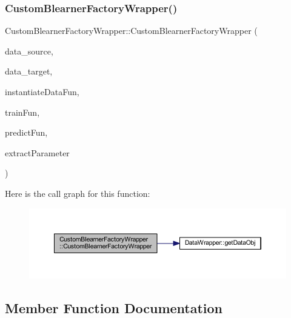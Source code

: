 \subsubsection{\texorpdfstring{Custom\+Blearner\+Factory\+Wrapper()}{CustomBlearnerFactoryWrapper()}}
{\footnotesize\ttfamily Custom\+Blearner\+Factory\+Wrapper\+::\+Custom\+Blearner\+Factory\+Wrapper (\begin{DoxyParamCaption}\item[{\mbox{\hyperlink{class_data_wrapper}{Data\+Wrapper}} \&}]{data\+\_\+source,  }\item[{\mbox{\hyperlink{class_data_wrapper}{Data\+Wrapper}} \&}]{data\+\_\+target,  }\item[{Rcpp\+::\+Function}]{instantiate\+Data\+Fun,  }\item[{Rcpp\+::\+Function}]{train\+Fun,  }\item[{Rcpp\+::\+Function}]{predict\+Fun,  }\item[{Rcpp\+::\+Function}]{extract\+Parameter }\end{DoxyParamCaption})\hspace{0.3cm}{\ttfamily [inline]}}

Here is the call graph for this function\+:\nopagebreak
\begin{figure}[H]
\begin{center}
\leavevmode
\includegraphics[width=350pt]{class_custom_blearner_factory_wrapper_af2a4252cc47bb70c23c71ed3f201e29f_cgraph}
\end{center}
\end{figure}


\subsection{Member Function Documentation}
\mbox{\label{class_custom_blearner_factory_wrapper_a3131dcf7abf08a2d8cd1da1472d2a36c}} 
